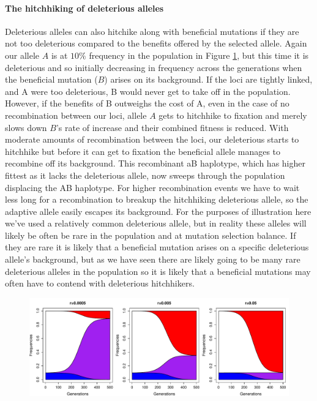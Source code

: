 \paragraph{The hitchhiking of deleterious alleles}
Deleterious alleles can also hitchike along with beneficial mutations if they are not too deleterious compared to the benefits offered by the selected allele. Again our allele $A$ is at $10\%$ frequency in the population in Figure \ref{fig:deleterious_HH}, but this time it is deleterious and so initially decreasing in frequency across the generations when the beneficial mutation ($B$) arises on its background. If the loci are tightly linked, and A were too deleterious, B would never get to take off in the population.   However, if the benefits of B outweighs the cost of A, even in the case of no recombination between our loci, allele $A$ gets to hitchhike to fixation and merely slows down $B$'s rate of increase and their combined fitness is reduced. With moderate amounts of recombination between the loci, our deleterious starts to hitchhike but before it can get to fixation the beneficial allele manages to recombine off its background. This recombinant aB haplotype, which has higher fittest as it lacks the deleterious allele, now sweeps through the population displacing the AB haplotype. For higher recombination events we have to wait less long for a recombination to breakup the hitchhiking deleterious allele, so the adaptive allele easily escapes its background.
For the purposes of illustration here we've used a relatively common deleterious allele, but in reality these alleles will likely be often be rare in the population and at mutation selection balance. If they are rare it is likely that a beneficial mutation arises on a specific deleterious allele's background, but as we have seen there are likely going to be many rare deleterious alleles in the population so it is likely that a beneficial mutations may often have to contend with deleterious hitchhikers. 
\begin{figure}
\begin{center}
  \includegraphics[width = 0.9 \textwidth]{figures/selection_recom_interaction/Deleterious_Hitchhiking.pdf}
  \caption{} \label{fig:deleterious_HH}  %
  \end{center}
\end{figure}

